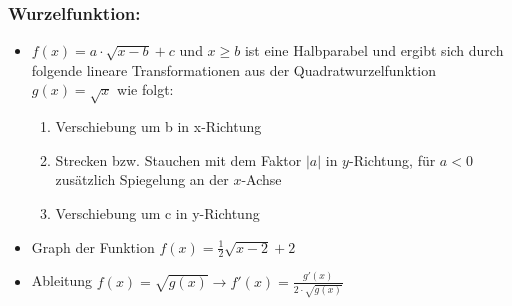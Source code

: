  \subsubsection{Wurzelfunktion:}
 \begin{itemize}
 \item $f(x) = a\cdot \sqrt{x-b}+c$ und $x\geq b$ ist eine Halbparabel und ergibt sich durch folgende lineare Transformationen aus der Quadratwurzelfunktion $g(x)= \sqrt{x}$ wie folgt:\\
\begin{enumerate}
    \item Verschiebung um b in x-Richtung\\
    \item Strecken bzw. Stauchen mit dem Faktor $|a|$ in $y$-Richtung, für $a<0$ zusätzlich Spiegelung an der $x$-Achse\\
    \item Verschiebung um c in y-Richtung
\end{enumerate}
\item Graph der Funktion $f(x)= \frac{1}{2} \sqrt{x-2}+2$\\
\item Ableitung $f(x)= \sqrt{g(x)} \longrightarrow f'(x) = \frac{g'(x)}{2\cdot \sqrt{g(x)}}$
 \end{itemize}
